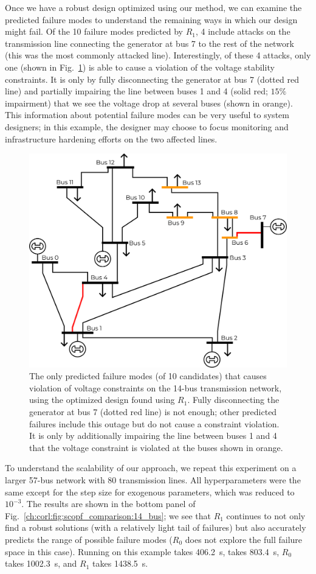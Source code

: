 Once we have a robust design optimized using our method, we can examine the predicted failure modes to understand the remaining ways in which our design might fail. Of the 10 failure modes predicted by $R_1$, 4 include attacks on the transmission line connecting the generator at bus 7 to the rest of the network (this was the most commonly attacked line). Interestingly, of these 4 attacks, only one (shown in Fig.~\ref{ch:corl:fig:predicted_failure_modes}) is able to cause a violation of the voltage stability constraints. It is only by fully disconnecting the generator at bus 7 (dotted red line) and partially impairing the line between buses 1 and 4 (solid red; $15\%$ impairment) that we see the voltage drop at several buses (shown in orange). This information about potential failure modes can be very useful to system designers; in this example, the designer may choose to focus monitoring and infrastructure hardening efforts on the two affected lines.

\begin{figure}[tb]
    \centering
    \includegraphics[width=0.4\linewidth]{images/global_methods/predicted_failure_modes.png}
    \caption{The only predicted failure modes (of 10 candidates) that causes violation of voltage constraints on the 14-bus transmission network, using the optimized design found using $R_1$. Fully disconnecting the generator at bus 7 (dotted red line) is not enough; other predicted failures include this outage but do not cause a constraint violation. It is only by additionally impairing the line between buses 1 and 4 that the voltage constraint is violated at the buses shown in orange.}
    \label{ch:corl:fig:predicted_failure_modes}
\end{figure}

To understand the scalability of our approach, we repeat this experiment on a larger 57-bus network with 80 transmission lines. All hyperparameters were the same except for the step size for exogenous parameters, which was reduced to $10^{-3}$. The results are shown in the bottom panel of Fig.~\ref{ch:corl:fig:scopf_comparison:14_bus}; we see that $R_1$ continues to not only find a robust solutions (with a relatively light tail of failures) but also accurately predicts the range of possible failure modes ($R_0$ does not explore the full failure space in this case). Running \gdr{} on this example takes \SI{406.2}{s}, \gda{} takes \SI{803.4}{s}, $R_0$ takes \SI{1002.3}{s}, and $R_1$ takes \SI{1438.5}{s}.

